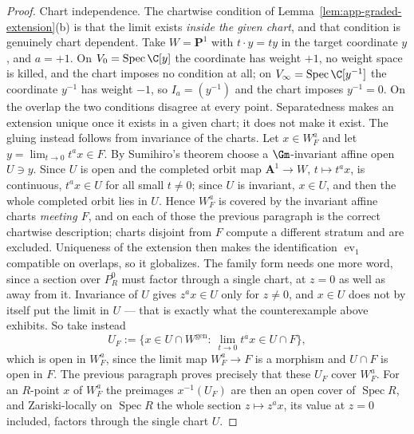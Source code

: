 \begin{proof}
Chart independence.  The chartwise condition of
Lemma~\ref{lem:app-graded-extension}\textup{(b)} is that the limit exists
\emph{inside the given chart}, and that condition is genuinely chart
dependent.  Take \(W=\mathbf P^1\) with \(t\cdot y=ty\) in the target
coordinate \(y\), and \(a=+1\).  On \(V_0=\operatorname{Spec}\C[y]\) the
coordinate has weight \(+1\), no weight space is killed, and the chart imposes
no condition at all; on \(V_\infty=\operatorname{Spec}\C[y^{-1}]\) the
coordinate \(y^{-1}\) has weight \(-1\), so \(I_a=(y^{-1})\) and the chart
imposes \(y^{-1}=0\).  On the overlap the two conditions disagree at every
point.  Separatedness makes an
extension unique once it exists in a given chart; it does not make it exist.
The gluing instead follows from invariance of the charts.  Let
\(x\in W_F^a\) and let \(y=\lim_{t\to0}t^ax\in F\).  By Sumihiro's theorem
choose a \(\Gm\)-invariant affine open \(U\ni y\).  Since \(U\) is open and
the completed orbit map \(\mathbf A^1\to W\), \(t\mapsto t^ax\), is
continuous, \(t^ax\in U\) for all small \(t\neq0\); since \(U\) is invariant,
\(x\in U\), and then the whole completed orbit lies in \(U\).  Hence
\(W_F^a\) is covered by the invariant affine charts \emph{meeting \(F\)}, and
on each of those the previous paragraph is the correct chartwise description;
charts disjoint from \(F\) compute a different stratum and are excluded.
Uniqueness of the extension then makes the identification
\(\operatorname{ev}_1\) compatible on overlaps, so it globalizes.  The family
form needs one more word, since a section over \(P^0_R\) must factor through a
single chart, at \(z=0\) as well as away from it.  Invariance of \(U\) gives
\(z^ax\in U\) only for \(z\neq0\), and \(x\in U\) does not by itself put the
limit in \(U\) --- that is exactly what the counterexample above exhibits.  So
take instead
\[
 U_F:=\{x\in U\cap W^{\mathrm{gen}}:\ \lim_{t\to0}t^ax\in U\cap F\},
\]
which is open in \(W_F^a\), since the limit map \(W_F^a\to F\) is a morphism
and \(U\cap F\) is open in \(F\).  The previous paragraph proves precisely
that these \(U_F\) cover \(W_F^a\).  For an \(R\)-point \(x\) of \(W_F^a\) the
preimages \(x^{-1}(U_F)\) are then an open cover of
\(\operatorname{Spec}R\), and Zariski-locally on \(\operatorname{Spec}R\) the
whole section \(z\mapsto z^ax\), its value at \(z=0\) included, factors
through the single chart \(U\).


\end{proof}
